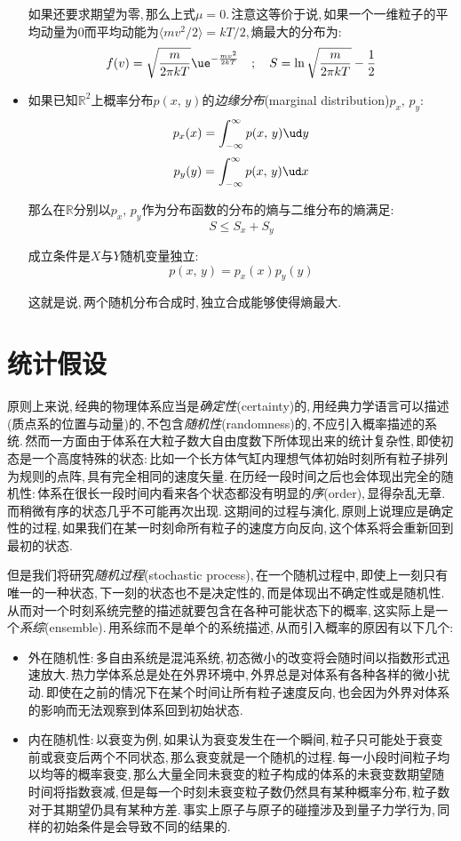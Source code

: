 \begin{itemize}
	如果还要求期望为零,\,那么上式$\mu=0$.\,注意这等价于说,\,如果一个一维粒子的平均动量为$0$而平均动能为$\langle mv^2/2\rangle=kT/2$,\,熵最大的分布为:
	\[f(v)=\sqrt{\frac{m}{2\pi kT}}\ue^{-\frac{mv^2}{2kT}}\quad ;\quad S=\ln\sqrt{\frac{m}{2\pi kT}}-\frac{1}{2}\]

	\item 如果已知$\mathbb{R}^2$上概率分布$p(x,\,y)$的\emph{边缘分布}(marginal distribution)$p_x,\,p_y$:
	\[p_x(x)=\int_{-\infty}^\infty p(x,\,y)\ud y\]
	\[p_y(y)=\int_{-\infty}^\infty p(x,\,y)\ud x\]

	那么在$\mathbb{R}$分别以$p_x,\,p_y$作为分布函数的分布的熵与二维分布的熵满足:
	\[S\leq S_x+S_y\]

	成立条件是$X$与$Y$随机变量独立:
	\[p(x,\,y)=p_x(x)p_y(y)\]

	这就是说,\,两个随机分布合成时,\,独立合成能够使得熵最大.

\end{itemize}

\section{统计假设}

原则上来说,\,经典的物理体系应当是\emph{确定性}(certainty)的,\,用经典力学语言可以描述(质点系的位置与动量)的,\,不包含\emph{随机性}(randomness)的,\,不应引入概率描述的系统.\,然而一方面由于体系在大粒子数大自由度数下所体现出来的统计复杂性,\,即使初态是一个高度特殊的状态:\,比如一个长方体气缸内理想气体初始时刻所有粒子排列为规则的点阵,\,具有完全相同的速度矢量.\,在历经一段时间之后也会体现出完全的随机性:\,体系在很长一段时间内看来各个状态都没有明显的\emph{序}(order),\,显得杂乱无章.\,而稍微有序的状态几乎不可能再次出现.\,这期间的过程与演化,\,原则上说理应是确定性的过程,\,如果我们在某一时刻命所有粒子的速度方向反向,\,这个体系将会重新回到最初的状态.

但是我们将研究\emph{随机过程}(stochastic process),\,在一个随机过程中,\,即使上一刻只有唯一的一种状态,\,下一刻的状态也不是决定性的,\,而是体现出不确定性或是随机性.\,从而对一个时刻系统完整的描述就要包含在各种可能状态下的概率,\,这实际上是一个\emph{系综}(ensemble).\,用系综而不是单个的系统描述,\,从而引入概率的原因有以下几个:

\begin{itemize}
	\item 外在随机性:\,多自由系统是混沌系统,\,初态微小的改变将会随时间以指数形式迅速放大.\,热力学体系总是处在外界环境中,\,外界总是对体系有各种各样的微小扰动.\,即使在之前的情况下在某个时间让所有粒子速度反向,\,也会因为外界对体系的影响而无法观察到体系回到初始状态.
	\item 内在随机性:\,以衰变为例,\,如果认为衰变发生在一个瞬间,\,粒子只可能处于衰变前或衰变后两个不同状态,\,那么衰变就是一个随机的过程.\,每一小段时间粒子均以均等的概率衰变,\,那么大量全同未衰变的粒子构成的体系的未衰变数期望随时间将指数衰减,\,但是每一个时刻未衰变粒子数仍然具有某种概率分布,\,粒子数对于其期望仍具有某种方差.\,事实上原子与原子的碰撞涉及到量子力学行为,\,同样的初始条件是会导致不同的结果的.
\end{itemize}


